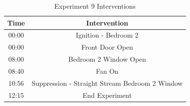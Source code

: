 \documentclass{article}
\begin{document}
\begin{table}[H]
	\centering
	\caption{Experiment 9 Interventions}
	\begin{tabular}{|c|c|} 
		\hline
		Time & Intervention \\ \hline \hline
		00:00 & Ignition - Bedroom 2 \\ \hline
		00:00 & Front Door Open \\ \hline
		08:00 & Bedroom 2 Window Open\\ \hline
		08:40 & Fan On\\ \hline
		10:56 & Suppression - Straight Stream Bedroom 2 Window\\ \hline
		12:15 & End Experiment\\ \hline
	\end{tabular}
	\label{Table:Exp9Interventions}
\end{table}
\end{document}
